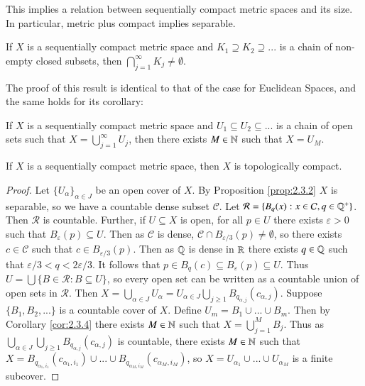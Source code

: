 This implies a relation between sequentially compact metric spaces and its size. In particular, metric plus compact implies separable.

\begin{prop}\label{prop:2.3.3}
    If $X$ is a sequentially compact metric space and $K_1 \supseteq K_2 \supseteq ...$ is a chain of non-empty closed subsets, then $\bigcap_{j=1}^{\infty}K_j \neq \emptyset$.
\end{prop}

The proof of this result is identical to that of the case for Euclidean Spaces, and the same holds for its corollary:

\begin{cor}\label{cor:2.3.4}
    If $X$ is a sequentially compact metric space and $U_1 \subseteq U_2 \subseteq ...$ is a chain of open sets such that $X = \bigcup_{j=1}^{\infty} U_j$, then there exists $M \in \mathbb N$ such that $X = U_M$.
\end{cor}

\begin{prop}\label{prop:2.3.5}
    If $X$ is a sequentially compact metric space, then $X$ is topologically compact.
\end{prop}
\begin{proof}
    Let $\{U_{\alpha}\}_{\alpha \in J}$ be an open cover of $X$. By Proposition \ref{prop:2.3.2} $X$ is separable, so we have a countable dense subset $\mathcal{C}$. Let $\mathcal{R} = \{B_q(x): x \in \mathcal{C},q \in \mathbb Q^+\}$. Then $\mathcal{R}$ is countable. Further, if $U \subseteq X$ is open, for all $p \in U$ there exists $\varepsilon > 0$ such that $B_{\varepsilon}(p) \subseteq U$. Then as $\mathcal{C}$ is dense, $\mathcal{C}\cap B_{\varepsilon/3}(p) \neq \emptyset$, so there exists $c \in \mathcal{C}$ such that $c \in B_{\varepsilon/3}(p)$. Then as $\mathbb Q$ is dense in $\mathbb R$ there exists $q \in \mathbb Q$ such that $\varepsilon/3 < q < 2\varepsilon/3$. It follows that $p \in B_q(c) \subseteq B_{\varepsilon}(p) \subseteq U$. Thus $U = \bigcup\{B \in \mathcal{R}:B \subseteq U\}$, so every open set can be written as a countable union of open sets in $\mathcal{R}$. Then $X = \bigcup_{\alpha \in J}U_{\alpha} = U_{\alpha \in J}\bigcup_{j\geq 1}B_{q_{\alpha,j}}(c_{\alpha,j})$. Suppose $\{B_1,B_2,...\}$ is a countable cover of $X$. Define $U_m = B_1 \cup...\cup B_m$. Then by Corollary \ref{cor:2.3.4} there exists $M \in \mathbb N$ such that $X = \bigcup_{j=1}^MB_j$. Thus as $\bigcup_{\alpha \in J}\bigcup_{j\geq 1}B_{q_{\alpha,j}}(c_{\alpha,j})$ is countable, there exists $M \in \mathbb N$ such that $X = B_{q_{\alpha_1,i_1}}(c_{\alpha_1,i_1})\cup ... \cup B_{q_{\alpha_M,i_M}}(c_{\alpha_M,i_M})$, so $X = U_{\alpha_1}\cup...\cup U_{\alpha_M}$ is a finite subcover.
\end{proof}

